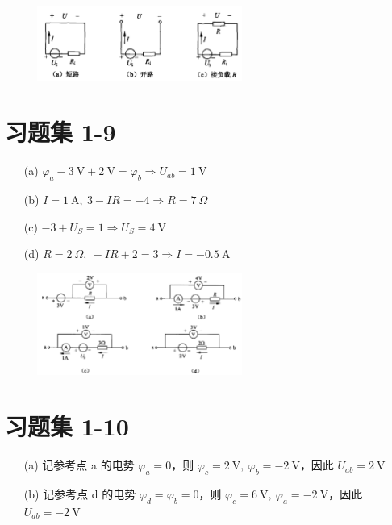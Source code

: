 \documentclass[UTF8]{report}
\theoremstyle{MyLineTheoremStyle} %
\theoremstyle{MyBlockTheoremStyle} %
\theoremstyle{MySubsubsectionStyle} %
\begin{document}
\begin{figure}[H]\centering
\includegraphics[width=0.6\textwidth]{assets/1/ae1cfc03fad5c98bfff08a663714a004.png}
\end{figure}

\section{习题集 1-9}

\begin{enumerate}
    \item[(a)]  $ \varphi_a - 3\ \mathrm{V} + 2\ \mathrm{V} = \varphi_b \Longrightarrow U_{ab} = 1\ \mathrm{V} $ 
    \item[(b)] $I = 1\ \mathrm{A},\  3 -IR= -4 \Longrightarrow R = 7\ \Omega$ 
    \item[(c)] $-3 + U_S = 1 \Longrightarrow U_S = 4 \ \mathrm{V}$ 
    \item[(d)] $R=2\ \Omega,\ -IR + 2 = 3 \Longrightarrow I = -0.5\ \mathrm{A}$ 
\end{enumerate}

\begin{figure}[H]\centering
\includegraphics[width=0.6\textwidth]{assets/1/d3d69ecd6b1c1bc476fd4a4957fb9e56.png}
\end{figure}

\section{习题集 1-10}



\begin{enumerate}
\item[(a)] 
记参考点 a 的电势 $\varphi_a=0$，则 $\varphi_c = 2\ \mathrm{V} ,\ \varphi_b = -2\ \mathrm{V}$，因此 $U_{ab} = 2\ \mathrm{V}$

\item[(b)] 
记参考点 d 的电势 $\varphi_d = \varphi_b =0$，则 $\varphi_c = 6\ \mathrm{V},\ \varphi_a = -2\ \mathrm{V}$，因此 $U_{ab} = -2\ \mathrm{V}$

\end{enumerate}
\end{document}
